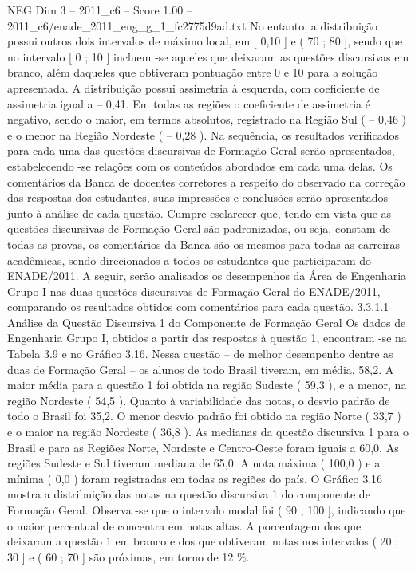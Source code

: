 \begin{textsample}{NEG Dim 3 – 2011\_c6 – Score 1.00 – 2011\_c6/enade\_2011\_eng\_g\_1\_fc2775d9ad.txt}
No entanto, a distribuição possui outros dois intervalos de máximo local, em [ 0,10 ] e ( 70 ; 80 ], sendo que no intervalo [ 0 ; 10 ] incluem -se aqueles que deixaram as questões discursivas em branco, além daqueles que obtiveram pontuação entre 0 e 10 para a solução apresentada.
A distribuição possui assimetria à esquerda, com coeficiente de assimetria igual a – 0,41.
Em todas as regiões o coeficiente de assimetria é negativo, sendo o maior, em termos absolutos, registrado na Região Sul ( – 0,46 ) e o menor na Região Nordeste ( – 0,28 ).
Na sequência, os resultados verificados para cada uma das questões discursivas de Formação Geral serão apresentados, estabelecendo -se relações com os conteúdos abordados em cada uma delas.
Os comentários da Banca de docentes corretores a respeito do observado na correção das respostas dos estudantes, suas impressões e conclusões serão apresentados junto à análise de cada questão.
Cumpre esclarecer que, tendo em vista que as questões discursivas de Formação Geral são padronizadas, ou seja, constam de todas as provas, os comentários da Banca são os mesmos para todas as carreiras acadêmicas, sendo direcionados a todos os estudantes que participaram do ENADE/2011.
A seguir, serão analisados os desempenhos da Área de Engenharia Grupo I nas duas questões discursivas de Formação Geral do ENADE/2011, comparando os resultados obtidos com comentários para cada questão. 3.3.1.1 Análise da Questão Discursiva 1 do Componente de Formação Geral Os dados de Engenharia Grupo I, obtidos a partir das respostas à questão 1, encontram -se na Tabela 3.9 e no Gráfico 3.16.
Nessa questão – de melhor desempenho dentre as duas de Formação Geral – os alunos de todo Brasil tiveram, em média, 58,2.
A maior média para a questão 1 foi obtida na região Sudeste ( 59,3 ), e a menor, na região Nordeste ( 54,5 ).
Quanto à variabilidade das notas, o desvio padrão de todo o Brasil foi 35,2.
O menor desvio padrão foi obtido na região Norte ( 33,7 ) e o maior na região Nordeste ( 36,8 ).
As medianas da questão discursiva 1 para o Brasil e para as Regiões Norte, Nordeste e Centro-Oeste foram iguais a 60,0.
As regiões Sudeste e Sul tiveram mediana de 65,0.
A nota máxima ( 100,0 ) e a mínima ( 0,0 ) foram registradas em todas as regiões do país.
O Gráfico 3.16 mostra a distribuição das notas na questão discursiva 1 do componente de Formação Geral.
Observa -se que o intervalo modal foi ( 90 ; 100 ], indicando que o maior percentual de concentra em notas altas.
A porcentagem dos que deixaram a questão 1 em branco e dos que obtiveram notas nos intervalos ( 20 ; 30 ] e ( 60 ; 70 ] são próximas, em torno de 12 \%.

\end{textsample}
